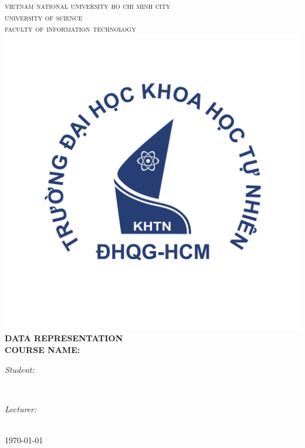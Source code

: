 \begin{titlepage}
\newcommand{\HRule}{\rule{\linewidth}{0.5mm}}
\centering

\textsc{\LARGE vietnam national university ho chi minh city}\\[0.2cm]
\textsc{\LARGE university of science}\\[0.3cm]
\textsc{\Large faculty of information technology}\\[0.5cm]

\includegraphics[scale=.35]{content/hcmus-logo.png}\\[0.5cm]

\huge{\bfseries{DATA REPRESENTATION}}\\
\textbf{\large COURSE NAME: \coursetitle}\\[0.5cm]

\begin{minipage}[t]{0.45\textwidth}
\begin{flushleft} \large
\emph{Student:}\\
\studentname
\end{flushleft}
\end{minipage}
~
\begin{minipage}[t]{0.45\textwidth}
\begin{flushright} \large
\emph{Lecturer:} \\
\teachername
\end{flushright}
\end{minipage}\\[5cm]

{\large \today}\\[2cm]


\vfill
\end{titlepage}
	